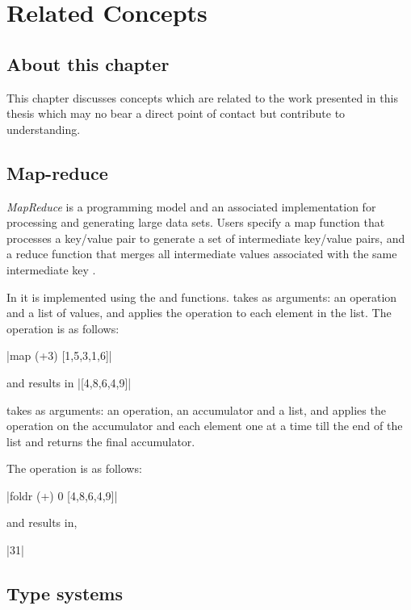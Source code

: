 \documentclass[proposal.tex]{subfiles}
\begin{document}
\chapter{Related Concepts}\label{chap:relatedWork}


\section{About this chapter}
This chapter discusses concepts which are related to the work presented in this thesis which may no bear a direct point of contact but 
contribute to understanding. 

\section{Map-reduce}

\textit{MapReduce} is a programming model and an associated implementation for processing and generating large data sets. Users specify a 
map function that processes a key/value pair to generate a set of intermediate key/value pairs, and a reduce function that merges all 
intermediate values associated with the same intermediate key \cite{dean2008mapreduce}.

In  it is implemented using the  and  functions. 
 takes as arguments: an operation and a list of values, and applies the operation to each element in the list. 
The 
operation is as follows:

|map (+3) [1,5,3,1,6]|

and results in
|[4,8,6,4,9]|

 takes as arguments: an operation, an accumulator and a list, and applies the operation on the accumulator and each 
element one at a time till the end of the list and returns the final accumulator.

The  operation is as follows:

|foldr (+) 0 [4,8,6,4,9]|

and results in,

|31|
 

\section{Type systems}
\end{document}
